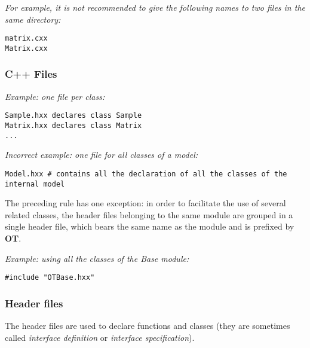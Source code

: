 
\emph{For example, it is not recommended to give the following names to two files in the same directory:}
\begin{lstlisting}[frame=TRBL]
matrix.cxx
Matrix.cxx
\end{lstlisting}

\subsubsection{C++ Files}

\emph{Example: one file per class:}
\begin{lstlisting}[frame=TBRL]
Sample.hxx declares class Sample
Matrix.hxx declares class Matrix
...
\end{lstlisting}

\emph{Incorrect example: one file for all classes of a model:}
\begin{lstlisting}[frame=TRLB]
Model.hxx # contains all the declaration of all the classes of the internal model
\end{lstlisting}

The preceding rule has one exception: in order to facilitate the use of several related classes, the header files belonging to the same module are grouped in a single header file, which bears the same name as the module and is prefixed by {\bf OT}.

\emph{Example: using all the classes of the Base module:}
\begin{lstlisting}[frame=TBRL]
#include "OTBase.hxx"
\end{lstlisting}

\subsubsection{Header files}
The header files are used to declare functions and classes (they are sometimes called \emph{interface definition} or \emph{interface specification}).

